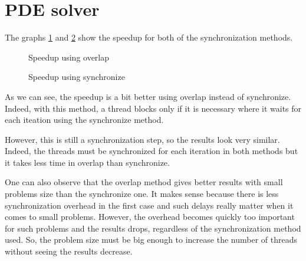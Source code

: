 \section{PDE solver}

The graphs \ref{overlap} and \ref{synchro} show the speedup for both of the synchronization methods.

\begin{figure}[H]
  \begin{center}
  \end{center}
  \caption{Speedup using overlap}
  \label{overlap}
\end{figure}

\begin{figure}[H]
  \begin{center}
  \end{center}
  \caption{Speedup using synchronize}
  \label{synchro}
\end{figure}

As we can see, the speedup is a bit better using overlap instead of synchronize. Indeed, with this method, a thread blocks only if it is necessary where it waits for each iteation using the synchronize method. 

However, this is still a synchronization step, so the results look very similar. Indeed, the threads must be synchronized for each iteration in both methods but it takes less time in overlap than synchronize.

One can also observe that the overlap method gives better results with small problems size than the synchronize one. It makes sense because there is less synchronization overhead in the first case and such delays really matter when it comes to small problems. However, the overhead becomes quickly too important for such problems and the results drops, regardless of the synchronization method used. So, the problem size must be big enough to increase the number of threads without seeing the results decrease. 
